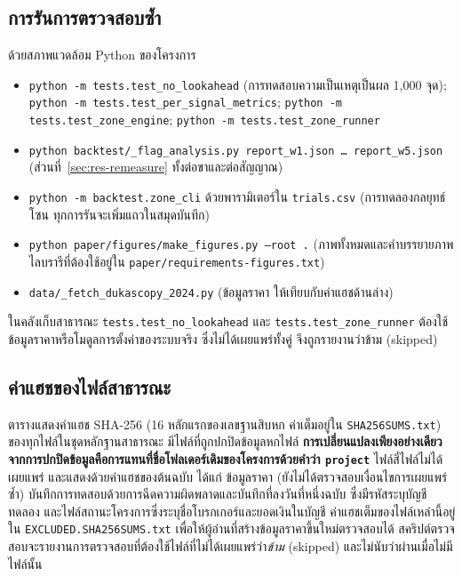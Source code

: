 \documentclass[11pt,a4paper]{article}
\newcommand{\tw}[1]{\texorpdfstring{\hspace{0pt}\mbox{#1}\hspace{0pt}}{#1}}
\begin{document}
\subsection{การรันการ\tw{ตรวจสอบ}ซ้ำ}
ด้วยสภาพแวดล้อม Python ของโครงการ
\begin{itemize}[before=\RaggedRight]
\item \texttt{python -m tests.test\_no\_lookahead} (การทดสอบความเป็นเหตุเป็นผล 1,000 จุด);
\texttt{python -m tests.test\_per\_signal\_metrics}; \texttt{python -m tests.test\_zone\_engine};
\texttt{python -m tests.test\_zone\_runner}
\item \texttt{python backtest/\_flag\_analysis.py report\_w1.json \ldots{} report\_w5.json}
(\tw{ส่วนที่}~\ref{sec:res-remeasure} ทั้งต่อขาและต่อสัญญาณ)
\item \texttt{python -m backtest.zone\_cli} ด้วยพารามิเตอร์ใน \texttt{trials.csv}
(การทดลองกลยุทธ์โซน ทุกการรันจะเพิ่มแถวในสมุดบันทึก)
\item \texttt{python paper/figures/make\_figures.py --root .} (ภาพทั้งหมดและคำบรรยายภาพ
ไลบรารีที่ต้องใช้อยู่ใน \texttt{paper/requirements-figures.txt})
\item \texttt{data/\_fetch\_dukascopy\_2024.py} (ข้อมูลราคา ให้เทียบกับค่าแฮชด้านล่าง)
\end{itemize}
ในคลังเก็บสาธารณะ \texttt{tests.test\_no\_lookahead} และ \texttt{tests.test\_zone\_runner}
ต้องใช้ข้อมูลราคาหรือโมดูลการตั้งค่าของระบบจริง ซึ่งไม่ได้เผยแพร่ทั้งคู่ จึงถูกรายงานว่าข้าม (skipped)

\subsection{ค่าแฮชของไฟล์สาธารณะ}
ตารางแสดงค่าแฮช SHA-256 (16 หลักแรกของเลขฐานสิบหก ค่าเต็มอยู่ใน
\texttt{SHA256SUMS.txt}) ของทุกไฟล์ในชุด\tw{หลักฐาน}สาธารณะ มีไฟล์ที่ถูกปกปิดข้อมูลหกไฟล์
\textbf{การเปลี่ยนแปลงเพียงอย่างเดียวจากการปกปิดข้อมูลคือการแทนที่ชื่อ\tw{โฟลเดอร์}เดิมของโครงการด้วยคำว่า
\texttt{project}} ไฟล์สี่ไฟล์ไม่ได้เผยแพร่ และแสดงด้วยค่าแฮชของต้นฉบับ ได้แก่ ข้อมูลราคา
(ยังไม่ได้\tw{ตรวจสอบ}เงื่อนไขการเผยแพร่ซ้ำ) บันทึกการทดสอบด้วยการฉีดความผิดพลาดและบันทึกที่ลงวันที่หนึ่งฉบับ
ซึ่งมีรหัสระบุบัญชีทดลอง และไฟล์สถานะโครงการซึ่งระบุชื่อ\tw{โบรกเกอร์}และยอดเงินในบัญชี ค่าแฮชเต็มของไฟล์เหล่านี้อยู่ใน
\texttt{EXCLUDED.SHA256SUMS.txt} เพื่อให้ผู้อ่านที่สร้างข้อมูลราคาขึ้นใหม่\tw{ตรวจสอบ}ได้
\tw{สคริปต์}\tw{ตรวจสอบ}จะรายงานการ\tw{ตรวจสอบ}ที่ต้องใช้ไฟล์ที่ไม่ได้เผยแพร่ว่า\emph{ข้าม} (skipped)
และไม่นับว่าผ่านเมื่อไม่มีไฟล์นั้น
\end{document}

